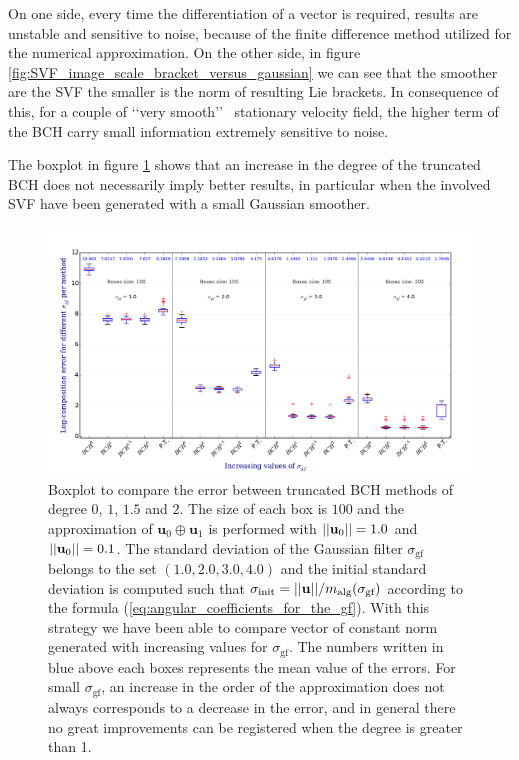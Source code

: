 On one side, every time the differentiation of a vector is required, results are unstable and sensitive to noise, because of the finite difference method utilized for the numerical approximation. On the other side, in figure \ref{fig:SVF_image_scale_bracket_versus_gaussian} we can see that the smoother are the SVF the smaller is the norm of resulting Lie brackets. In consequence of this, for a couple of \lq\lq very smooth\rq\rq~ stationary velocity field, the higher term of the BCH carry small information extremely sensitive to noise.

The boxplot in figure \ref{fig:SVF_boxplot_comparisons_BCH} shows that an increase in the degree of the truncated BCH does not necessarily imply better results, in particular when the involved SVF have been generated with a small Gaussian smoother.

\begin{figure}[!ht]
	\hspace{-0.5cm}
	\includegraphics[scale=0.5]{figures/SVF_boxplot_comparisons_BCH.pdf}
	\caption{Boxplot to compare the error between truncated BCH methods of degree $0$, $1$, $1.5$ and $2$. The size of each box is $100$ and the approximation of $\mathbf{u}_{0}\oplus \mathbf{u}_1$ is performed with $\vert\lvert \mathbf{u}_{0} \rvert\vert = 1.0$ and $\vert\lvert \mathbf{u}_{0} \rvert\vert = 0.1$. The standard deviation of the Gaussian filter $\sigma_{\text{gf}}$ belongs to the set $(1.0, 2.0, 3.0, 4.0)$ and the initial standard deviation is computed such that $\sigma_{\text{init}} = \vert\lvert \mathbf{u} \rvert\vert/m_{\text{alg}}(\sigma_{\text{gf}})$ according to the formula (\ref{eq:angular_coefficients_for_the_gf}). With this strategy we have been able to compare vector of constant norm generated with increasing values for $\sigma_{\text{gf}}$. The numbers written in blue above each boxes represents the mean value of the errors. For small $\sigma_{\text{gf}}$, an increase in the order of the approximation does not always corresponds to a decrease in the error, and in general there no great improvements can be registered when the degree is greater than 1. }
	\label{fig:SVF_boxplot_comparisons_BCH}
\end{figure}


